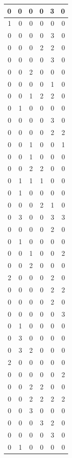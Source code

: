 \documentclass[
]{article}
\begin{document}
\begin{tabular}{r|r|r|r|r|r}
\hline
0 & 0 & 0 & 0 & 3 & 0\\
\hline
1 & 0 & 0 & 0 & 0 & 0\\
\hline
0 & 0 & 0 & 0 & 3 & 0\\
\hline
0 & 0 & 0 & 2 & 2 & 0\\
\hline
0 & 0 & 0 & 0 & 3 & 0\\
\hline
0 & 0 & 2 & 0 & 0 & 0\\
\hline
0 & 0 & 0 & 0 & 1 & 0\\
\hline
0 & 0 & 1 & 2 & 2 & 0\\
\hline
0 & 1 & 0 & 0 & 0 & 0\\
\hline
0 & 0 & 0 & 0 & 3 & 0\\
\hline
0 & 0 & 0 & 0 & 2 & 2\\
\hline
0 & 0 & 1 & 0 & 0 & 1\\
\hline
0 & 0 & 1 & 0 & 0 & 0\\
\hline
0 & 0 & 2 & 2 & 0 & 0\\
\hline
0 & 1 & 1 & 1 & 0 & 0\\
\hline
0 & 1 & 0 & 0 & 0 & 0\\
\hline
0 & 0 & 0 & 2 & 1 & 0\\
\hline
0 & 3 & 0 & 0 & 3 & 3\\
\hline
0 & 0 & 0 & 0 & 2 & 0\\
\hline
0 & 1 & 0 & 0 & 0 & 0\\
\hline
0 & 0 & 1 & 0 & 0 & 2\\
\hline
0 & 0 & 2 & 0 & 0 & 0\\
\hline
2 & 0 & 0 & 0 & 2 & 0\\
\hline
0 & 0 & 0 & 0 & 2 & 2\\
\hline
0 & 0 & 0 & 0 & 2 & 0\\
\hline
0 & 0 & 0 & 0 & 0 & 3\\
\hline
0 & 1 & 0 & 0 & 0 & 0\\
\hline
0 & 3 & 0 & 0 & 0 & 0\\
\hline
0 & 3 & 2 & 0 & 0 & 0\\
\hline
2 & 0 & 0 & 0 & 0 & 0\\
\hline
0 & 0 & 0 & 0 & 0 & 2\\
\hline
0 & 0 & 2 & 2 & 0 & 0\\
\hline
0 & 0 & 2 & 2 & 2 & 2\\
\hline
0 & 0 & 3 & 0 & 0 & 0\\
\hline
0 & 0 & 0 & 3 & 2 & 0\\
\hline
0 & 0 & 0 & 0 & 3 & 0\\
\hline
0 & 1 & 0 & 0 & 0 & 0\\

\end{tabular}
\end{document}
